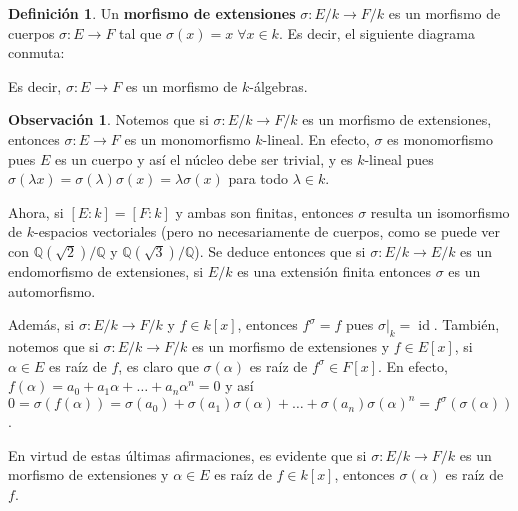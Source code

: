 \documentclass[12pt]{book}
\theoremstyle{definition}
\newtheorem{obs}[teo]{Observación}
\newtheorem{defn}[teo]{Definición}
\newcommand{\QQ}{\mathbb{Q}}
\DeclareMathOperator{\id}{id}
\begin{document}
\begin{defn}
Un \textbf{morfismo de extensiones} $\sigma: E/k\to F/k$ es un morfismo de cuerpos $\sigma:E\to F$ tal que $\sigma(x)=x\;\forall x\in k$. Es decir, el siguiente diagrama conmuta: \begin{center}
\end{center} Es decir, $\sigma:E\to F$ es un morfismo de $k$-álgebras.
\end{defn}

\begin{obs}
Notemos que si $\sigma:E/k\to F/k$ es un morfismo de extensiones, entonces $\sigma:E\to F$ es un monomorfismo $k$-lineal. En efecto, $\sigma$ es monomorfismo pues $E$ es un cuerpo y así el núcleo debe ser trivial, y es $k$-lineal pues $\sigma(\lambda x)=\sigma(\lambda)\sigma(x)=\lambda \sigma(x)$ para todo $\lambda\in k$.

Ahora, si $[E:k]=[F:k]$ y ambas son finitas, entonces $\sigma$ resulta un isomorfismo de $k$-espacios vectoriales (pero no necesariamente de cuerpos, como se puede ver con $\QQ(\sqrt{2})/\QQ$ y $\QQ(\sqrt{3})/\QQ$). Se deduce entonces que si $\sigma:E/k\to E/k$ es un endomorfismo de extensiones, si $E/k$ es una extensión finita entonces $\sigma$ es un automorfismo.

Además, si $\sigma:E/k\to F/k$ y $f\in k[x]$, entonces $f^\sigma = f$ pues $\left.\sigma\right|_{k}= \id$. También, notemos que si $\sigma:E/k\to F/k$ es un morfismo de extensiones y $f\in E[x]$, si $\alpha\in E$ es raíz de $f$, es claro que $\sigma(\alpha)$ es raíz de $f^\sigma\in F[x]$. En efecto, $f(\alpha)=a_0 + a_1\alpha + \ldots + a_n \alpha^n = 0$ y así $0=\sigma(f(\alpha)) = \sigma(a_0) + \sigma(a_1)\sigma(\alpha)+\ldots + \sigma(a_n)\sigma(\alpha)^n = f^\sigma(\sigma(\alpha))$.

En virtud de estas últimas afirmaciones, es evidente que si $\sigma:E/k\to F/k$ es un morfismo de extensiones y $\alpha\in E$ es raíz de $f\in k[x]$, entonces $\sigma(\alpha)$ es raíz de $f$.
\end{obs}
\end{document}
